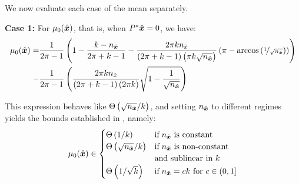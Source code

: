 We now evaluate each case of the mean separately.

\textbf{Case 1:} For $\mu_0(\hat{\boldsymbol{x}})$, that is, when $P^*\hat{\boldsymbol{x}}=0$, we have:
\begin{align}
\label{eq:mu_0}
    \mu_0(\hat{\boldsymbol{x}}) = &\frac{1}{2\pi-1}\left(
    1 - \frac{k-n_{\hat{\boldsymbol{x}}}}{2\pi + k -1} - \frac{2\pi kn_{\hat{x}}}{\left(2\pi+k-1\right)\left(\pi k\sqrt{n_{\hat{\boldsymbol{x}}}}\right)}\left(\pi-\arccos\left(\nicefrac{1}{\sqrt{n_{\hat{\boldsymbol{x}}}}}\right)\right)\right)\nonumber\\
    -&\frac{1}{2\pi-1}\left(\frac{2\pi kn_{\hat{x}}}{\left(2\pi + k -1\right)\left(2\pi k\right)}\sqrt{1-\frac{1}{\sqrt{n_{\hat{\boldsymbol{x}}}}}}\right)
\end{align}

This expression behaves like $\Theta\left(\sqrt{n_{\hat{\boldsymbol{x}}}}/k\right)$, and setting $n_{\hat{\boldsymbol{x}}}$ to different regimes yields the bounds established in , namely:
\begin{equation*}
     \mu_0(\hat{\boldsymbol{x}}) \in 
        \begin{cases}
            \Theta\left(1/k\right) & \text{if}\; n_{\hat{\boldsymbol{x}}} \text{ is constant} \\
            \Theta\left(\sqrt{n_{\hat{\boldsymbol{x}}}}/k\right) &\text{if}\; n_{\hat{\boldsymbol{x}}} \text{ is non-constant}\\ &\text{and sublinear in } k \\
            \Theta\left(1/\sqrt{k}\right) & \text{if}\; n_{\hat{\boldsymbol{x}}} = ck \text{ for } c \in (0, 1]
        \end{cases}
\end{equation*}

